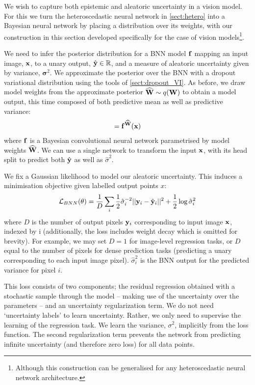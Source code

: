 We wish to capture both epistemic and aleatoric uncertainty in a vision model.
For this we turn the heteroscedastic neural network in \cref{sect:hetero} into a Bayesian neural network by placing a distribution over its weights, with our construction in this section developed specifically for the case of vision models\footnote{Although this construction can be generalised for any heteroscedastic neural network architecture.}.

We need to infer the posterior distribution for a BNN model $\mathbf{f}$ mapping an input image, $\mathbf{x}$, to a unary output, $\hat{\mathbf{y}} \in \mathbb{R}$, and a measure of aleatoric uncertainty given by variance, $\mathbf{\sigma}^2$. We approximate the posterior over the BNN with a dropout variational distribution using the tools of \cref{sect:dropout_VI}. 
As before, we draw model weights from the approximate posterior ${\widehat{\mathbf{W}}} \sim q(\mathbf{W})$ to obtain a model output, this time composed of both predictive mean as well as predictive variance:
\begin{equation}
[\hat{\y}, \hat{\mathbf{\sigma}}^2] = \f^{\Wh}(\textbf{x})
\end{equation}
where $\mathbf{f}$ is a Bayesian convolutional neural network parametrised by model weights ${\widehat{\mathbf{W}}}$. We can use a single network to transform the input $\mathbf{x}$, with its head split to predict both $\hat{\mathbf{y}}$ as well as $\hat{\sigma}^2$.

We fix a Gaussian likelihood to model our aleatoric uncertainty.
This induces a minimisation objective given labelled output points $x$:
\begin{equation}
\mathcal{L}_{BNN}(\theta) = \frac{1}{D} \sum_i \frac{1}{2} \hat{\sigma}^{-2}_i ||\mathbf{y}_i-\hat{\mathbf{y}}_i||^2 + \frac{1}{2} \log{\hat{\sigma}_i^2}
\end{equation}
where $D$ is the number of output pixels $\mathbf{y}_i$ corresponding to input image $\mathbf{x}$, indexed by i (additionally, the loss includes weight decay which is omitted for brevity). For example, we may set $D=1$ for image-level regression tasks, or $D$ equal to the number of pixels for dense prediction tasks (predicting a unary corresponding to each input image pixel). $\hat{\sigma}^2_i$ is the BNN output for the predicted variance for pixel $i$.

This loss consists of two components; the residual regression obtained with a stochastic sample through the model -- making use of the uncertainty over the parameters  -- and an uncertainty regularization term. We do not need `uncertainty labels' to learn uncertainty. Rather, we only need to supervise the learning of the regression task. We learn the variance, $\sigma^2$, implicitly from the loss function. The second regularization term prevents the network from predicting infinite uncertainty (and therefore zero loss) for all data points.

